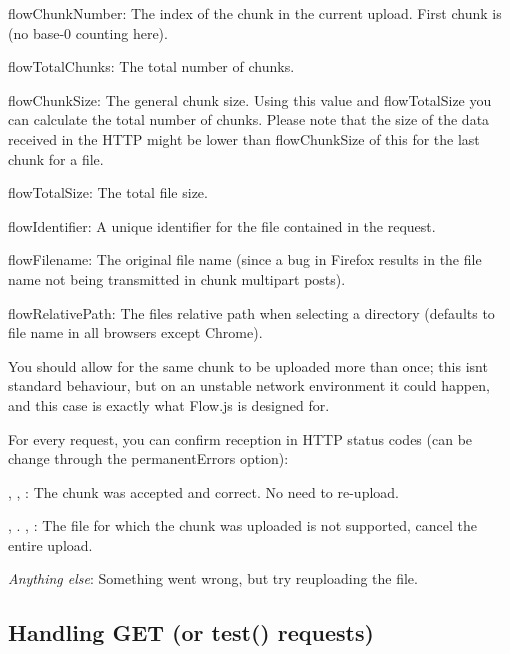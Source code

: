 \begin{DoxyItemize}
\item {\ttfamily flow\+Chunk\+Number}\+: The index of the chunk in the current upload. First chunk is {} (no base-\/0 counting here).
\item {\ttfamily flow\+Total\+Chunks}\+: The total number of chunks.
\item {\ttfamily flow\+Chunk\+Size}\+: The general chunk size. Using this value and {\ttfamily flow\+Total\+Size} you can calculate the total number of chunks. Please note that the size of the data received in the H\+T\+TP might be lower than {\ttfamily flow\+Chunk\+Size} of this for the last chunk for a file.
\item {\ttfamily flow\+Total\+Size}\+: The total file size.
\item {\ttfamily flow\+Identifier}\+: A unique identifier for the file contained in the request.
\item {\ttfamily flow\+Filename}\+: The original file name (since a bug in Firefox results in the file name not being transmitted in chunk multipart posts).
\item {\ttfamily flow\+Relative\+Path}\+: The file\textquotesingle{}s relative path when selecting a directory (defaults to file name in all browsers except Chrome).
\end{DoxyItemize}

You should allow for the same chunk to be uploaded more than once; this isn\textquotesingle{}t standard behaviour, but on an unstable network environment it could happen, and this case is exactly what Flow.\+js is designed for.

For every request, you can confirm reception in H\+T\+TP status codes (can be change through the {\ttfamily permanent\+Errors} option)\+:


\begin{DoxyItemize}
\item {}, {}, {}\+: The chunk was accepted and correct. No need to re-\/upload.
\item {}, {}. {}, {}\+: The file for which the chunk was uploaded is not supported, cancel the entire upload.
\item {\itshape Anything else}\+: Something went wrong, but try reuploading the file.
\end{DoxyItemize}

\subsection*{Handling G\+ET (or {\ttfamily test()} requests)}

